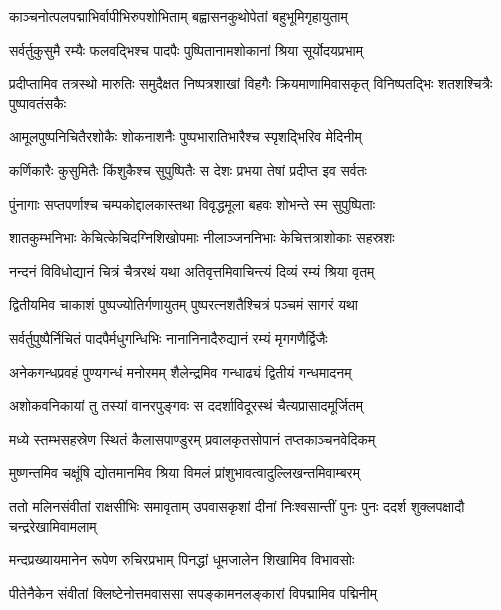 \twolineshloka
{काञ्चनोत्पलपद्माभिर्वापीभिरुपशोभिताम्}
{बह्वासनकुथोपेतां बहुभूमिगृहायुताम्} %

\twolineshloka
{सर्वर्तुकुसुमै रम्यैः फलवद्भिश्च पादपैः}
{पुष्पितानामशोकानां श्रिया सूर्योदयप्रभाम्} %

\threelineshloka
{प्रदीप्तामिव तत्रस्थो मारुतिः समुदैक्षत}
{निष्पत्रशाखां विहगैः क्रियमाणामिवासकृत्}
{विनिष्पतद्भिः शतशश्चित्रैः पुष्पावतंसकैः} %

\twolineshloka
{आमूलपुष्पनिचितैरशोकैः शोकनाशनैः}
{पुष्पभारातिभारैश्च स्पृशद्भिरिव मेदिनीम्} %

\twolineshloka
{कर्णिकारैः कुसुमितैः किंशुकैश्च सुपुष्पितैः}
{स देशः प्रभया तेषां प्रदीप्त इव सर्वतः} %

\twolineshloka
{पुंनागाः सप्तपर्णाश्च चम्पकोद्दालकास्तथा}
{विवृद्धमूला बहवः शोभन्ते स्म सुपुष्पिताः} %

\twolineshloka
{शातकुम्भनिभाः केचित्केचिदग्निशिखोपमाः}
{नीलाञ्जननिभाः केचित्तत्राशोकाः सहस्रशः} %

\twolineshloka
{नन्दनं विविधोद्यानं चित्रं चैत्ररथं यथा}
{अतिवृत्तमिवाचिन्त्यं दिव्यं रम्यं श्रिया वृतम्} %

\twolineshloka
{द्वितीयमिव चाकाशं पुष्पज्योतिर्गणायुतम्}
{पुष्परत्नशतैश्चित्रं पञ्चमं सागरं यथा} %

\twolineshloka
{सर्वर्तुपुष्पैर्निचितं पादपैर्मधुगन्धिभिः}
{नानानिनादैरुद्यानं रम्यं मृगगणैर्द्विजैः} %

\twolineshloka
{अनेकगन्धप्रवहं पुण्यगन्धं मनोरमम्}
{शैलेन्द्रमिव गन्धाढ्यं द्वितीयं गन्धमादनम्} %

\twolineshloka
{अशोकवनिकायां तु तस्यां वानरपुङ्गवः}
{स ददर्शाविदूरस्थं चैत्यप्रासादमूर्जितम्} %

\twolineshloka
{मध्ये स्तम्भसहस्रेण स्थितं कैलासपाण्डुरम्}
{प्रवालकृतसोपानं तप्तकाञ्चनवेदिकम्} %

\twolineshloka
{मुष्णन्तमिव चक्षूंषि द्योतमानमिव श्रिया}
{विमलं प्रांशुभावत्वादुल्लिखन्तमिवाम्बरम्} %

\threelineshloka
{ततो मलिनसंवीतां राक्षसीभिः समावृताम्}
{उपवासकृशां दीनां निःश्वसान्तीं पुनः पुनः}
{ददर्श शुक्लपक्षादौ चन्द्ररेखामिवामलाम्} %

\twolineshloka
{मन्दप्रख्यायमानेन रूपेण रुचिरप्रभाम्}
{पिनद्धां धूमजालेन शिखामिव विभावसोः} %

\twolineshloka
{पीतेनैकेन संवीतां क्लिष्टेनोत्तमवाससा}
{सपङ्कामनलङ्कारां विपद्मामिव पद्मिनीम्} %

